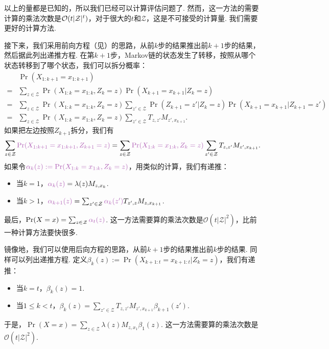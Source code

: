 以上的量都是已知的，所以我们已经可以计算评估问题了. 然而，这一方法的需要计算的乘法次数是$\mathcal{O}(t|\mathcal Z|^t)$，对于很大的$t$和$\mathcal Z$，这是不可接受的计算量. 我们需要更好的计算方法.

接下来，我们采用前向方程（见）的思路，从前$k$步的结果推出前$k+1$步的结果，然后据此列出递推方程. 在第$k+1$步，Markov链的状态发生了转移，按照从哪个状态转移到了哪个状态，我们可以拆分概率：
\begin{align*}
      &\Pr(X_{1:k+1}=x_{1:k+1}) \\
    = &\sum_{z\in \mathcal Z}\Pr(X_{1:k}=x_{1:k}, Z_k=z)\Pr(X_{k+1}=x_{k+1}|Z_k=z)\\
    = &\sum_{z\in \mathcal Z}\Pr(X_{1:k}=x_{1:k}, Z_k=z)\sum_{z'\in \mathcal Z}\Pr(Z_{k+1}=z'|Z_k=z)\Pr(X_{k+1}=x_{k+1}|Z_{k+1}=z')\\
    = &\sum_{z\in \mathcal Z}\Pr(X_{1:k}=x_{1:k}, Z_k=z)\sum_{z'\in \mathcal Z}T_{z,z'}M_{z',x_{k+1}}.
\end{align*}
如果把左边按照$Z_{k+1}$拆分，我们有
\[
    \sum_{z\in\mathcal Z}\light{\Pr(X_{1:k+1}=x_{1:k+1}, Z_{k+1}=z)} = \sum_{z\in \mathcal Z}\light{\Pr(X_{1:k}=x_{1:k}, Z_k=z)}\sum_{z'\in \mathcal Z}T_{z,z'}M_{z',x_{k+1}}.
\]
如果令$\light{\alpha_k(z):=\Pr(X_{1:k}=x_{1:k}, Z_k=z)}$，用类似的计算，我们有递推：
\begin{itemize}
    \item 当$k=1$，$\light{\alpha_k(z)} = \lambda(z)M_{z,x_k}$.
    \item 当$k>1$，$\light{\alpha_{k+1}(z)} = \sum_{z' \in \mathcal Z}\light{\alpha_{k}(z')}T_{z',z}M_{z,x_{k+1}}$.
\end{itemize}
最后，$\Pr(X=x) = \sum_{z\in \mathcal Z}\light{\alpha_t(z)}$. 这一方法需要算的乘法次数是$\mathcal O(t|\mathcal Z|^2)$，比前一种计算方法要快很多.

镜像地，我们可以使用后向方程的思路，从前$k+1$步的结果推出前$k$步的结果. 同样可以列出递推方程. 定义$\beta_k(z):=\Pr(X_{k+1:t}=x_{k+1:t} | Z_k=z)$，我们有递推：
\begin{itemize}
    \item 当$k = t$，$\beta_k(z) = 1$.
    \item 当$1 \leq k < t$，$\beta_{k}(z) = \sum_{z' \in \mathcal Z}T_{z,z'}M_{z',x_{k+1}}\beta_{k+1}(z')$.
\end{itemize}
于是，$\Pr(X=x) = \sum_{z\in \mathcal Z}\lambda(z)M_{z,x_1}\beta_1(z)$. 这一方法需要算的乘法次数是$\mathcal O(t|\mathcal Z|^2)$.


